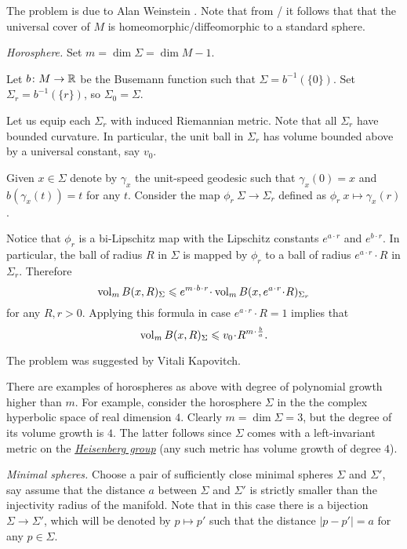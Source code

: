 The problem is due to Alan Weinstein \cite[see][]{weinstein}.
Note that from \cite{micallef-moore}/\cite{boehm-wilking} it follows that
that the universal cover of $M$ is homeomorphic/diffeomorphic to a standard sphere.



\textit{Horosphere.}
Set 
$m=\dim \Sigma=\dim M-1$.

Let $b\colon M\to\mathbb{R}$ be the Busemann function such that $\Sigma=b^{-1}(\{0\})$.
Set  $\Sigma_r=b^{-1}(\{r\})$, so $\Sigma_0=\Sigma$.

Let us equip each $\Sigma_r$ with induced Riemannian metric.
Note that all $\Sigma_r$ have bounded curvature.
In particular, the unit ball in $\Sigma_r$ has volume bounded above by a universal constant, say $v_0$.
 

Given $x\in \Sigma$ denote by $\gamma_x$ 
the unit-speed geodesic
such that $\gamma_x(0)=x$ and $b(\gamma_x(t))=t$ for any $t$.
Consider the map $\phi_{r}\:\Sigma\to\Sigma_r$ defined as
$\phi_r\:x\mapsto \gamma_x(r)$.

Notice that $\phi_r$ is a bi-Lipschitz map with the Lipschitz constants $e^{a\cdot r}$ and $e^{b\cdot r}$.
In particular, the ball of radius $R$ in $\Sigma$ is mapped by $\phi_r$
to a ball of radius $e^{a\cdot r}\cdot R$ in $\Sigma_r$.
Therefore
\[\vol_m B(x,R)_\Sigma\le e^{m\cdot b\cdot r}\cdot \vol_m B(x,e^{a\cdot r}\cdot R)_{\Sigma_r}\]
for any $R,r>0$.
Applying this formula in case $e^{a\cdot r}\cdot R=1$ implies that
\[\vol_m B(x,R)_\Sigma\le v_0\cdot R^{m\cdot \frac ba}.\]

The problem was suggested by Vitali Kapovitch.

There are examples of horospheres as above with degree of polynomial growth higher than $m$.
For example, consider the horosphere $\Sigma$ in the
the complex hyperbolic space 
of real dimension $4$.
Clearly $m=\dim \Sigma=3$, but the degree of its volume growth is $4$.
The latter follows since $\Sigma$ comes with a left-invariant metric on the \hyperref[Heisenberg group]{\emph{Heisenberg group}} (any such metric has volume  growth of degree $4$).


                                                      



\textit{Minimal spheres.}
Choose a pair of sufficiently close minimal spheres $\Sigma$ and $\Sigma'$,
say assume that the distance $a$ between $\Sigma$ and $\Sigma'$ is strictly smaller than the injectivity radius of the manifold.
Note that in this case there is a bijection $\Sigma\to \Sigma'$, which will be denoted by $p\mapsto p'$ such that the distance $|p-p'|=a$ for any $p\in\Sigma$.

